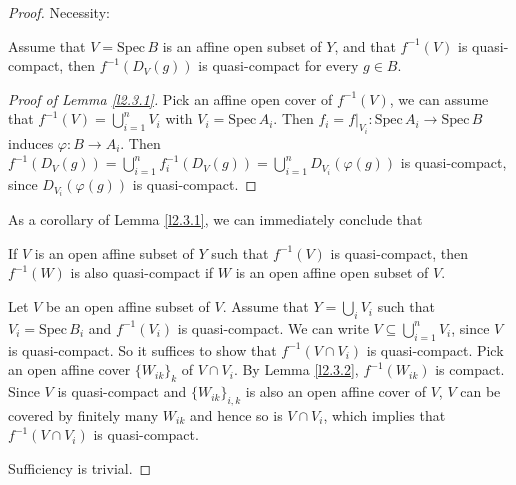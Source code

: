 \begin{proof}
	Necessity:
	\begin{lm}
		\label{l2.3.1}
		Assume that $V=\mathrm{Spec}\, B$ is an affine open subset of $Y$, and that $f^{-1}(V)$ is quasi-compact, then $f^{-1}(D_V(g))$ is quasi-compact for every $g\in B$.
	\end{lm}
	\begin{proof}[Proof of Lemma \ref*{l2.3.1}]
		Pick an affine open cover of $f^{-1}(V)$, we can assume that $f^{-1}(V)=\bigcup^n_{i=1}V_i$ with $V_i=\mathrm{Spec}\,A_i$. Then $f_i=f|_{V_i}: \mathrm{Spec}\,A_i \rightarrow \mathrm{Spec}\,B$
		induces $\varphi: B \rightarrow A_i$. Then $f^{-1}(D_V(g))=\bigcup^n_{i=1} f_i^{-1}(D_V(g))=\bigcup^n_{i=1}D_{V_i}(\varphi(g) )$ is quasi-compact, since $D_{V_i}(\varphi(g) )$ is quasi-compact.
	\end{proof}
	As a corollary of Lemma \ref{l2.3.1}, we can immediately conclude that
	\begin{lm}
		\label{l2.3.2}
		If $V$ is an open affine subset of $Y$ such that $f^{-1}(V)$ is quasi-compact, then $f^{-1}(W)$ is also quasi-compact if $W$ is an open affine open subset of $V$.
	\end{lm}
	Let $V$ be an open affine subset of $V$. Assume that $Y=\bigcup_i V_i$ such that $V_i= \mathrm{Spec}\,B_i$ and $f^{-1}(V_i) $ is quasi-compact. We
	can write $V\subseteq \bigcup_{i=1}^{n}V_i$, since $V$ is quasi-compact. So it suffices to show that $f^{-1}(V\cap V_i)$ is quasi-compact.
	Pick an open affine cover $\{W_{ik}\}_k$ of $ V\cap V_i$. By Lemma \ref{l2.3.2}, $f^{-1}(W_{ik})$ is compact. Since
	$V$ is quasi-compact and $\{W_{ik}\}_{i,k}$ is also an open affine cover of $V$, $V$ can be covered by finitely many $W_{ik}$ and hence so is $V\cap V_i$, which implies that $f^{-1}(V\cap V_i)$ is quasi-compact.
	
	Sufficiency is trivial.
\end{proof}

